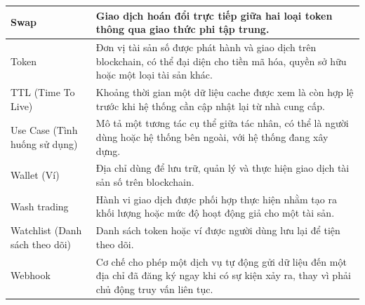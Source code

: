 \begin{longtable}{|L{3.8cm}|L{11.2cm}|}
Swap & Giao dịch hoán đổi trực tiếp giữa hai loại token thông qua giao thức phi tập trung. \\
\hline

Token & Đơn vị tài sản số được phát hành và giao dịch trên blockchain, có thể đại diện cho tiền mã hóa, quyền sở hữu hoặc một loại tài sản khác. \\
\hline

TTL (Time To Live) & Khoảng thời gian một dữ liệu cache được xem là còn hợp lệ trước khi hệ thống cần cập nhật lại từ nhà cung cấp. \\
\hline

Use Case (Tình huống sử dụng) & Mô tả một tương tác cụ thể giữa tác nhân, có thể là người dùng hoặc hệ thống bên ngoài, với hệ thống đang xây dựng. \\
\hline

Wallet (Ví) & Địa chỉ dùng để lưu trữ, quản lý và thực hiện giao dịch tài sản số trên blockchain. \\
\hline

Wash trading & Hành vi giao dịch được phối hợp thực hiện nhằm tạo ra khối lượng hoặc mức độ hoạt động giả cho một tài sản. \\
\hline

Watchlist (Danh sách theo dõi) & Danh sách token hoặc ví được người dùng lưu lại để tiện theo dõi. \\
\hline

Webhook & Cơ chế cho phép một dịch vụ tự động gửi dữ liệu đến một địa chỉ đã đăng ký ngay khi có sự kiện xảy ra, thay vì phải chủ động truy vấn liên tục. \\
\hline

\end{longtable}
\normalsize
